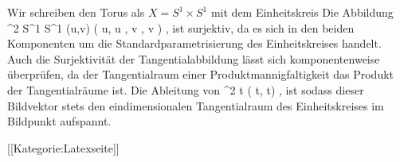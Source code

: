 Wir schreiben den Torus als $X=S^1 \times S^1$ mit dem Einheitskreis
Die Abbildung
\maabbeledisp {\varphi} {\R^2} {S^1 \times S^1
} {(u,v)} {( \cos  u, \sin  u , \cos  v , \sin  v )
} {,}
ist surjektiv, da es sich in den beiden Komponenten um die Standardparametrisierung des Einheitskreises handelt. Auch die Surjektivität der Tangentialabbildung lässt sich komponentenweise überprüfen, da der Tangentialraum einer Produktmannigfaltigkeit das Produkt der Tangentialräume ist. Die Ableitung von
\maabbeledisp {} {\R} { \R^2
} { t } { ( \cos  t, \sin  t)
} {,}
ist
 sodass dieser Bildvektor stets den eindimensionalen Tangentialraum des Einheitskreises im Bildpunkt aufspannt.

 [[Kategorie:Latexseite]]
